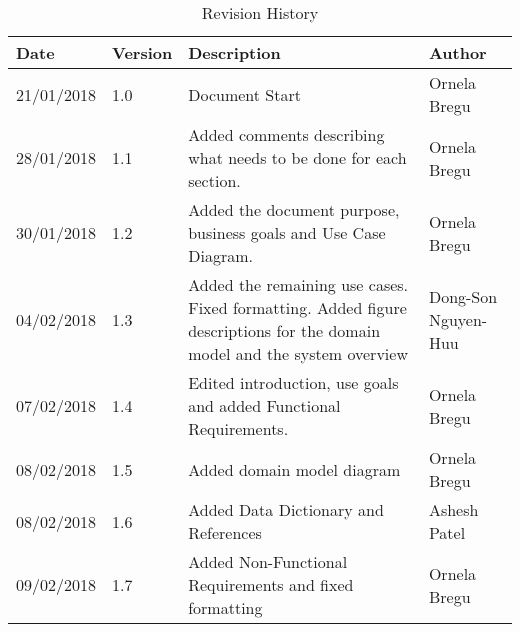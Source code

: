 \documentclass[12pt]{article}
\begin{document}
\begin{table}[ht]


\begin{center}
\begin{tabular}{| m{2cm} | m{2cm}| m{8cm} | m{3cm}|}
\hline
\textbf{Date} & \textbf{Version} & \textbf{Description} & \textbf{Author} \\

\hline 21/01/2018 & 1.0 & Document Start & Ornela Bregu\\ \hline 28/01/2018 & 1.1 & Added comments describing what needs to be done for each section. & Ornela Bregu  \\
\hline 30/01/2018 & 1.2 & Added the document purpose, business goals and Use Case Diagram. & Ornela Bregu  \\ \hline 04/02/2018 & 1.3 & Added the remaining use cases. Fixed formatting. Added figure descriptions for the domain model and the system overview & Dong-Son Nguyen-Huu \\ 
\hline 07/02/2018 & 1.4 & Edited introduction,  use goals and added Functional Requirements. & Ornela Bregu \\ 
\hline 08/02/2018 & 1.5 & Added domain model diagram & Ornela Bregu  \\ 
\hline 08/02/2018 & 1.6 & Added Data Dictionary and References & Ashesh Patel \\

\hline 09/02/2018 & 1.7 & Added Non-Functional Requirements and fixed formatting & Ornela Bregu  \\ 


\hline
\end{tabular}
\end{center}
\caption{Revision History}
\end{table}

\clearpage
\listoffigures

\listoftables
\clearpage

\tableofcontents



\clearpage
\end{document}
